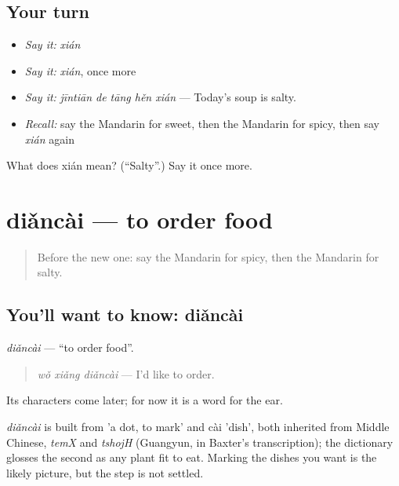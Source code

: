 \subsection*{Your turn}
\begin{itemize}
\raggedright
  \item \emph{Say it:} \emph{xián}
  \item \emph{Say it:} \emph{xián}, once more
  \item \emph{Say it:} \emph{jīntiān de tāng hěn xián} — Today's soup is salty.
  \item \emph{Recall:} say the Mandarin for sweet, then the Mandarin for spicy, then say \emph{xián} again
\end{itemize}

\begin{tcolorbox}[breakable,colback=teal!4,colframe=teal!35!black,title={Before you move on}]
What does xián mean? (\textquotedblleft{}Salty\textquotedblright{}.) Say it once more.
\end{tcolorbox}
\section[diǎncài]{diǎncài — to order food}

\label{lesson:ZH-C71-diancai}



\begin{quote}
Before the new one: say the Mandarin for spicy, then the Mandarin for salty.
\end{quote}

\subsection*{You'll want to know: diǎncài}
\emph{diǎncài} — \textquotedblleft{}to order food\textquotedblright{}.

\begin{quote}
\emph{wǒ xiǎng diǎncài} — I'd like to order.
\end{quote}

Its characters come later; for now it is a word for the ear.

\begin{cousinweb}
\emph{diǎncài} is built from  'a dot, to mark' and cài 'dish', both inherited from Middle Chinese, \emph{temX} and \emph{tshojH} (Guangyun, in Baxter's transcription); the dictionary glosses the second as any plant fit to eat. Marking the dishes you want is the likely picture, but the step is not settled.
\end{cousinweb}

